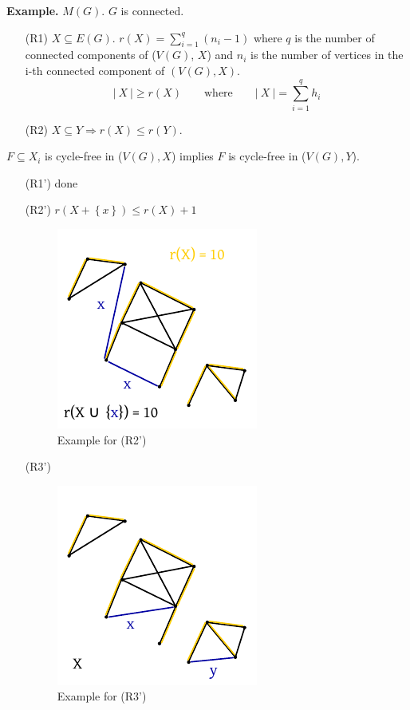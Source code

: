 \documentclass{article}
\newcommand{\card}[1]{\left|\:\!#1\:\!\right|}
\newcommand{\set}[1]{\left\{#1\right\}}
\begin{document}
\textbf{Example.}
  $M(G)$. $G$ is connected.
  \begin{itemize}
    \item[(R1)] $X \subseteq E(G)$. $r(X) = \sum_{i=1}^q (n_i - 1)$ where $q$ is the number of connected components of ($V(G)$, $X$) and $n_i$ is the number of vertices in the i-th connected component of $(V(G), X)$.
    \[ \card{X} \geq r(X) \qquad \text{where} \qquad \card{X} = \sum_{i=1}^q h_i \]
    \item[(R2)] $X \subseteq Y \Rightarrow r(X) \leq r(Y)$.
  \end{itemize}
  $F \subseteq X_i$ is cycle-free in ($V(G), X$) implies $F$ is cycle-free in ($V(G), Y$).
  \begin{itemize}
    \item[(R1')] done
    \item[(R2')] $r(X + \set{x}) \leq r(X) + 1$
      \begin{figure}[!ht]
        \begin{center}
          \includegraphics{img/r2_prime_example.pdf}
          \caption{Example for (R2')}
        \end{center}
      \end{figure}
    \item[(R3')]
      \begin{figure}[!ht]
        \begin{center}
          \includegraphics{img/r3_prime_example.pdf}
          \caption{Example for (R3')}
        \end{center}
      \end{figure}
  \end{itemize}
\end{document}
